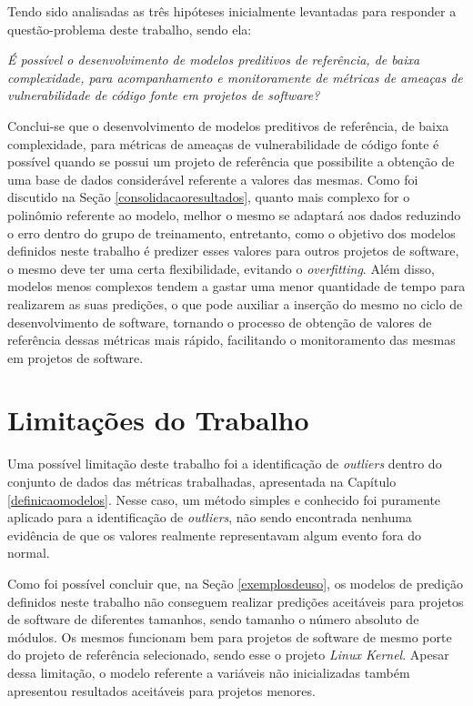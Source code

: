 Tendo sido analisadas as três hipóteses inicialmente levantadas para responder a
questão-problema deste trabalho, sendo ela: 

\begin{center}
  \textit{É possível o desenvolvimento de modelos preditivos de referência, de
  baixa complexidade, para acompanhamento e monitoramente de métricas de ameaças
de vulnerabilidade de código fonte em projetos de software?}
\end{center}

Conclui-se que o desenvolvimento de modelos preditivos de referência, de baixa
complexidade, para métricas de ameaças de vulnerabilidade de código fonte é
possível quando se possui um projeto de referência que possibilite a obtenção de
uma base de dados considerável referente a valores das mesmas. Como foi
discutido na Seção \ref{consolidacaoresultados}, quanto mais complexo for o
polinômio referente ao modelo, melhor o mesmo se adaptará aos dados reduzindo o
erro dentro do grupo de treinamento, entretanto, como o objetivo dos modelos
definidos neste trabalho é predizer esses valores para outros projetos de
software, o mesmo deve ter uma certa flexibilidade, evitando o
\textit{overfitting}. Além disso, modelos menos complexos tendem a gastar uma
menor quantidade de tempo para realizarem as suas predições, o que pode auxiliar a
inserção do mesmo no ciclo de desenvolvimento de software, tornando o processo
de obtenção de valores de referência dessas métricas mais rápido, facilitando o
monitoramento das mesmas em projetos de software.


\section{Limitações do Trabalho}

Uma possível limitação deste trabalho foi a identificação de \textit{outliers}
dentro do conjunto de dados das métricas trabalhadas, apresentada na Capítulo
\ref{definicaomodelos}. Nesse caso, um método simples e conhecido foi puramente
aplicado para a identificação de \textit{outliers}, não sendo encontrada nenhuma
evidência de que os valores realmente representavam algum evento fora do normal.

Como foi possível concluir que, na Seção \ref{exemplosdeuso}, os modelos de predição
definidos neste trabalho não conseguem realizar predições aceitáveis para
projetos de software de diferentes tamanhos, sendo tamanho o número absoluto de
módulos. Os mesmos funcionam bem para projetos de software de mesmo porte do
projeto de referência selecionado, sendo esse o projeto \textit{Linux Kernel}.
Apesar dessa limitação, o modelo referente a variáveis não inicializadas também
apresentou resultados aceitáveis para projetos menores.

